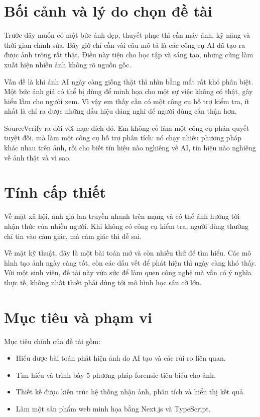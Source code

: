 \documentclass[14pt,a4paper,oneside]{report}
\begin{document}
\section{Bối cảnh và lý do chọn đề tài}
Trước đây muốn có một bức ảnh đẹp, thuyết phục thì cần máy ảnh, kỹ năng và thời gian chỉnh sửa. Bây giờ chỉ cần vài câu mô tả là các công cụ AI đã tạo ra được ảnh trông rất thật. Điều này tiện cho học tập và sáng tạo, nhưng cũng làm xuất hiện nhiều ảnh không rõ nguồn gốc.

Vấn đề là khi ảnh AI ngày càng giống thật thì nhìn bằng mắt rất khó phân biệt. Một bức ảnh giả có thể bị dùng để minh họa cho một sự việc không có thật, gây hiểu lầm cho người xem. Vì vậy em thấy cần có một công cụ hỗ trợ kiểm tra, ít nhất là chỉ ra được những dấu hiệu đáng nghi để người dùng cẩn thận hơn.

SourceVerify ra đời với mục đích đó. Em không cố làm một công cụ phán quyết tuyệt đối, mà làm một công cụ hỗ trợ phân tích: nó chạy nhiều phương pháp khác nhau trên ảnh, rồi cho biết tín hiệu nào nghiêng về AI, tín hiệu nào nghiêng về ảnh thật và vì sao.

\section{Tính cấp thiết}
Về mặt xã hội, ảnh giả lan truyền nhanh trên mạng và có thể ảnh hưởng tới nhận thức của nhiều người. Khi không có công cụ kiểm tra, người dùng thường chỉ tin vào cảm giác, mà cảm giác thì dễ sai.

Về mặt kỹ thuật, đây là một bài toán mở và còn nhiều thứ để tìm hiểu. Các mô hình tạo ảnh ngày càng tốt, còn các dấu vết để phát hiện thì ngày càng khó thấy. Với một sinh viên, đề tài này vừa sức để làm quen công nghệ mà vẫn có ý nghĩa thực tế, không nhất thiết phải dùng tới mô hình học sâu cỡ lớn.

\section{Mục tiêu và phạm vi}
Mục tiêu chính của đề tài gồm:
\begin{itemize}
  \item Hiểu được bài toán phát hiện ảnh do AI tạo và các rủi ro liên quan.
  \item Tìm hiểu và trình bày 5 phương pháp forensic tiêu biểu cho ảnh.
  \item Thiết kế được kiến trúc hệ thống nhận ảnh, phân tích và hiển thị kết quả.
  \item Làm một sản phẩm web minh họa bằng Next.js và TypeScript.
\end{itemize}
\end{document}
